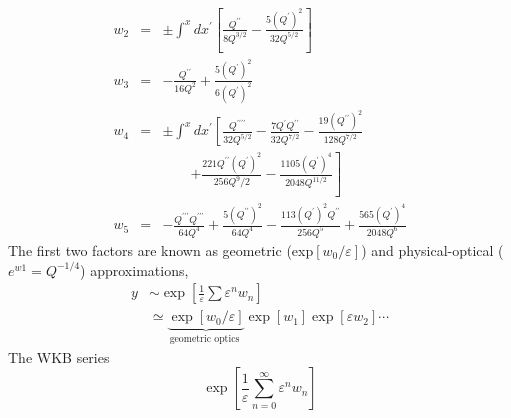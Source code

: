 \begin{equation}
\begin{array}{ccl} w_{2} &=&\pm \int^{x} d x^{\prime}\left[\frac{Q^{\prime \prime}}{8 Q^{3 / 2}}-\frac{5\left(Q^{\prime}\right)^{2}}{32 Q^{5 / 2}}\right] \\ w_{3} &=&-\frac{Q^{\prime \prime}}{16 Q^{2}}+\frac{5\left(Q^{\prime}\right)^{2}}{6\left(Q^{\prime}\right)^{2}} \\ w_{4}&=&\pm \int^{x} d x^{\prime}\left[\frac{Q^{\prime \prime \prime \prime}}{32 Q^{5 / 2}}\right.-\frac{7 Q^{\prime} Q^{\prime \prime}}{32 Q^{7 / 2}}-\frac{19\left(Q^{\prime \prime}\right)^{2}}{128 Q^{7 / 2}} \\ &&\qquad \left.+\frac{221 Q^{\prime \prime}\left(Q^{\prime}\right)^{2}}{256 Q^{9} / 2}-\frac{1105\left(Q^{\prime}\right)^{4}}{2048 Q^{11 / 2}}\right] \\ w_{5}&=&-\frac{Q^{\prime \prime \prime} Q^{\prime \prime \prime}}{64 Q^{4}}+\frac{5\left(Q^{\prime \prime}\right)^{2}}{64 Q^{4}}-\frac{113\left(Q^{\prime}\right)^{2} Q^{\prime \prime}}{256 Q^{5}}+\frac{565\left(Q^{\prime}\right)^{4}}{2048 Q^{6}} \end{array}
\end{equation}
The first two factors are known as geometric (exp$ [w_0 / \varepsilon]$) and physical-optical ($e^{w1} = Q^{-1/4}$) approximations,
\begin{equation}
    \begin{aligned}
        y &\sim \exp \left[\frac{1}{\varepsilon} \sum \varepsilon^{n} w_{n}\right]\\
        &\simeq \underbrace{\exp \left[w_{0} / \varepsilon\right]}_{\text {geometric optics }} \exp \left[w_{1}\right] \exp \left[\varepsilon w_{2}\right] \cdots
    \end{aligned}
\end{equation}
The WKB series
\begin{equation}
    \exp \left[\frac{1}{\varepsilon} \sum_{n=0}^{\infty} \varepsilon^{n} w_{n}\right]
    \end{equation}
